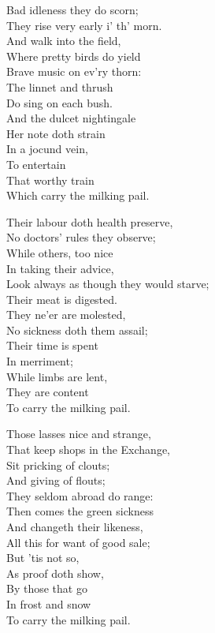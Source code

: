 \begin{dcverse}
\begin{patverse}
Bad idleness they do scorn;\\
They rise very early i’ th’ morn.\\
And walk into the field,\\
Where pretty birds do yield\\
Brave music on ev’ry thorn:\\
The linnet and thrush\\
Do sing on each bush.\\
And the dulcet nightingale\\
Her note doth strain\\
In a jocund vein,\\
To entertain\\
That worthy train\\
Which carry the milking pail.
\end{patverse}

\begin{patverse}
Their labour doth health preserve,\\
No doctors' rules they observe;\\
While others, too nice\\
In taking their advice,\\
Look always as though they would starve;\\
Their meat is digested.\\
They ne’er are molested,\\
No sickness doth them assail;\\
Their time is spent\\
In merriment;\\
While limbs are lent,\\
They are content\\
To carry the milking pail.
\end{patverse}

\begin{patverse}
Those lasses nice and strange,\\
That keep shops in the Exchange,\\
Sit pricking of clouts;\\
And giving of flouts;\\
They seldom abroad do range:\\
Then comes the green sickness\\
And changeth their likeness,\\
All this for want of good sale;\\
But ’tis not so,\\
As proof doth show,\\
By those that go\\
In frost and snow\\
To carry the milking pail.
\end{patverse}


\end{dcverse}
